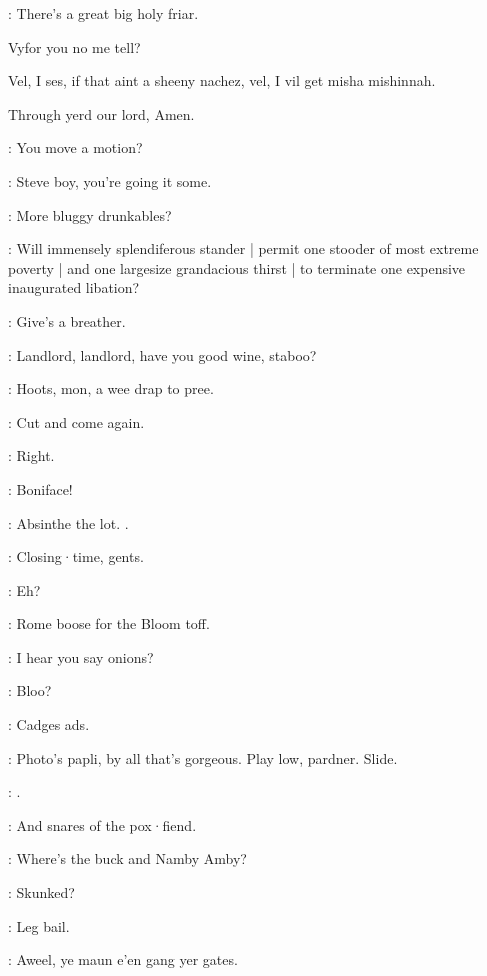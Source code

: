 \mulligan:
There's a great big holy friar.

\begin{omitted}
Vyfor you no me tell?

Vel,
I ses,
if that aint a sheeny nachez,
vel,
I vil get misha mishinnah.

Through yerd our lord,
Amen.
\end{omitted}


\stephen:
You move a motion?

\lenehan:
Steve boy,
you're going it some.

\dixon:
More bluggy drunkables?

\lynch:
Will immensely splendiferous stander |
permit one stooder of most extreme poverty |
and one largesize grandacious thirst |
to terminate one expensive inaugurated libation?

\crotthers:
Give's a breather.

\punch:
Landlord,
landlord,
have you good wine,
staboo?

\crotthers:
Hoots,
mon,
a wee drap to pree.

\lenehan:
Cut and come again.

\barman:
Right.

\punch:
Boniface!

\stephen:
Absinthe the lot.
.

\barman:
Closing·time,
gents.

\lenehan:
Eh?

\stephen:
Rome boose for the Bloom toff.

\lynch:
I hear you say onions?

\bannon:
Bloo?

\dixon:
Cadges ads.

\bannon:
Photo's papli,
by all that's gorgeous.
Play low,
pardner.
Slide.

\mulligan:
.


\stephen:
And snares of the pox·fiend.

\bantam:
Where's the buck and Namby Amby?

\stephen:
Skunked?

\lenehan:
Leg bail.

\crotthers:
Aweel,
ye maun e'en gang yer gates.

